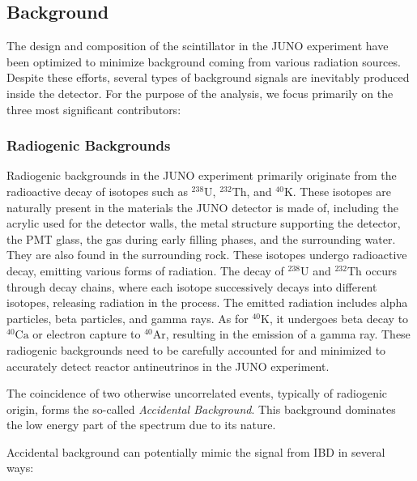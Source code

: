 \subsection{Background}
The design and composition of the scintillator in the JUNO experiment have been optimized to minimize background coming from various radiation sources. Despite these efforts, several types of background signals are inevitably produced inside the detector. For the purpose of the analysis, we focus primarily on the three most significant contributors:

\subsubsection*{Radiogenic Backgrounds}


Radiogenic backgrounds in the JUNO experiment primarily originate from the radioactive decay of isotopes such as $^{238}\mathrm{U}$, $^{232}\mathrm{Th}$, and $^{40}\mathrm{K}$. These isotopes are naturally present in the materials the JUNO detector is made of, including the acrylic used for the detector walls, the metal structure supporting the detector, the PMT glass, the gas during early filling phases, and the surrounding water. They are also found in the surrounding rock. These isotopes undergo radioactive decay, emitting various forms of radiation. The decay of $^{238}\mathrm{U}$ and $^{232}\mathrm{Th}$ occurs through decay chains, where each isotope successively decays into different isotopes, releasing radiation in the process. The emitted radiation includes alpha particles, beta particles, and gamma rays. As for $^{40}\mathrm{K}$, it undergoes beta decay to $^{40}\mathrm{Ca}$ or electron capture to $^{40}\mathrm{Ar}$, resulting in the emission of a gamma ray. These radiogenic backgrounds need to be carefully accounted for and minimized to accurately detect reactor antineutrinos in the JUNO experiment.

The coincidence of two otherwise uncorrelated events, typically of radiogenic origin, forms the so-called \textit{Accidental Background}. This background  dominates  the low  energy  part  of  the  spectrum  due to its nature.

Accidental background can potentially mimic the signal from IBD in several ways:

